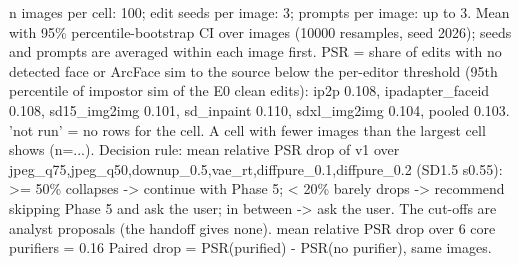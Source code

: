 \begin{table}[t]
\par\footnotesize n images per cell: 100; edit seeds per image: 3; prompts per image: up to 3. Mean with 95\% percentile-bootstrap CI over images (10000 resamples, seed 2026); seeds and prompts are averaged within each image first. PSR = share of edits with no detected face or ArcFace sim to the source below the per-editor threshold (95th percentile of impostor sim of the E0 clean edits): ip2p 0.108, ipadapter\_faceid 0.108, sd15\_img2img 0.101, sd\_inpaint 0.110, sdxl\_img2img 0.104, pooled 0.103. 'not run' = no rows for the cell. A cell with fewer images than the largest cell shows (n=...). Decision rule: mean relative PSR drop of v1 over jpeg\_q75,jpeg\_q50,downup\_0.5,vae\_rt,diffpure\_0.1,diffpure\_0.2 (SD1.5 s0.55): >= 50\% collapses -> continue with Phase 5; < 20\% barely drops -> recommend skipping Phase 5 and ask the user; in between -> ask the user. The cut-offs are analyst proposals (the handoff gives none). mean relative PSR drop over 6 core purifiers = 0.16 Paired drop = PSR(purified) - PSR(no purifier), same images.
\end{table}
